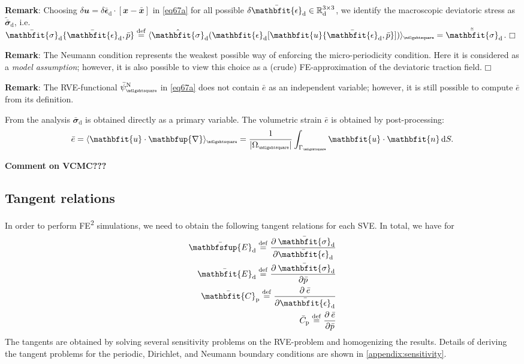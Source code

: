 \documentclass[12pt,a4paper]{article}
\renewcommand{\ta}[1]{\mathbfit{#1}}
\renewcommand{\ts}[1]{\mathbfit{#1}}
\renewcommand{\tf}[1]{\mathbfsfup{#1}}
\renewcommand{\diff}{\mathbfup{\nabla}}
\renewcommand{\Box}{\mdlgwhtsquare}
\DeclarePairedDelimiter{\homgen}{\langle}{\rangle_\rve}
\renewcommand{\dev}{\mathrm{d}}
\newcommand{\volume}{|\Omega_\rve|}
\newcommand{\ded}{\mathrm{d}}
\newcommand{\dep}{\mathrm{p}}
\newcommand{\rve}{
  {\mathchoice
   {\mbox{\scalebox{0.67}{$\Box$}}}
   {\mbox{\scalebox{0.67}{$\Box$}}}
   {\mbox{\scalebox{0.5}{$\Box$}}}
   {\mbox{\scalebox{0.375}{$\Box$}}}
  }
}
\begin{document}
\textbf{Remark}: Choosing $\delta\ta{u}=\delta\bar{\ts\epsilon}_\dev\cdot[\ta{x}-\bar{\ta{x}}]$ in \cref{eq67a} for all possible $\delta\bar{\ts\epsilon}_\dev\in\set{R}^{3\times 3}_\dev$, we identify the macroscopic deviatoric stress as $\tilde{\bar{\ts\sigma}}_\dev$, i.e.\ $\bar{\ts\sigma}_\dev\{\bar{\ts\epsilon}_\dev,\bar{p}\} \defeq
\homgen{ \hat{\ts{\sigma}}_\dev(\ts{\epsilon}_\dev[\ta{u}\{\bar{\ts\epsilon}_\dev,\bar{p}\}]) } = \tilde{\bar{\ts\sigma}}_\dev$. $\Box$

\textbf{Remark}: The Neumann condition represents the weakest possible way of enforcing the micro-periodicity condition.
Here it is considered as a \emph{model assumption}; however, it is also possible to view this choice as a (crude) FE-approximation of the deviatoric traction field. $\Box$

\textbf{Remark}: The RVE-functional $\bar{\psi}_\rve^\Neumann$ in \cref{eq67a} does not contain $\bar{e}$ as an independent variable; however, it is still possible to compute $\bar{e}$ from its definition.

From the analysis $\bar{\ts\sigma}_\dev$ is obtained directly as a primary variable.
The volumetric strain $\bar{e}$ is obtained by post-processing:
\begin{align}
 \bar{e} = \homgen{\ta u\cdot\diff} = \frac{1}{\volume} \int_{\Gamma_\rve} \ta u \cdot \ta n\dif S.
\end{align}

\textbf{Comment on VCMC???} 


\subsection{Tangent relations}
In order to perform FE\textsuperscript{2} simulations, we need to obtain the following tangent relations for each SVE.
In total, we have for 
\begin{subequations}
\label{eq:macro_tangents}
\begin{align}
 \bar{\tf E}_\ded \defeq \pd{\bar{\ts\sigma}_\dev}{\bar{\ts\epsilon}_\dev}\\
 \bar{\ts E}_\ded \defeq \pd{\bar{\ts\sigma}_\dev}{\bar{p}}\\
 \bar{\ts C}_\dep \defeq \pd{\bar{e}}{\bar{\ts\epsilon}_\dev}\\
 \bar{C}_\dep \defeq \pd{\bar{e}}{\bar{p}}
\end{align}
\end{subequations}
The tangents are obtained by solving several sensitivity problems on the RVE-problem and homogenizing the results.
Details of deriving the tangent problems for the periodic, Dirichlet, and Neumann boundary conditions are shown in \cref{appendix:sensitivity}.
\end{document}
